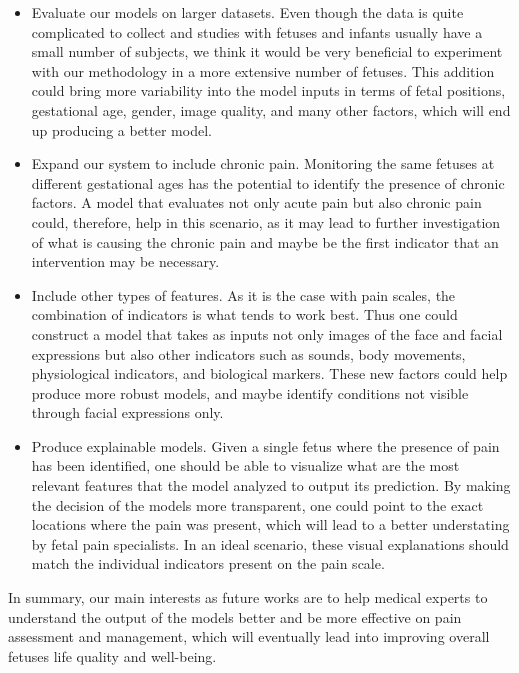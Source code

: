 \begin{itemize}
    \item Evaluate our models on larger datasets. Even though the data is quite complicated to collect and studies with fetuses and infants usually have a small number of subjects, we think it would be very beneficial to experiment with our methodology in a more extensive number of fetuses. This addition could bring more variability into the model inputs in terms of fetal positions, gestational age, gender, image quality, and many other factors, which will end up producing a better model.
    
    \item Expand our system to include chronic pain. Monitoring the same fetuses at different gestational ages has the potential to identify the presence of chronic factors. A model that evaluates not only acute pain but also chronic pain could, therefore, help in this scenario, as it may lead to further investigation of what is causing the chronic pain and maybe be the first indicator that an intervention may be necessary.

    \item Include other types of features. As it is the case with pain scales, the combination of indicators is what tends to work best. Thus one could construct a model that takes as inputs not only images of the face and facial expressions but also other indicators such as sounds, body movements, physiological indicators, and biological markers. These new factors could help produce more robust models, and maybe identify conditions not visible through facial expressions only.
    
    \item Produce explainable models. Given a single fetus where the presence of pain has been identified, one should be able to visualize what are the most relevant features that the model analyzed to output its prediction. By making the decision of the models more transparent, one could point to the exact locations where the pain was present, which will lead to a better understating by fetal pain specialists. In an ideal scenario, these visual explanations should match the individual indicators present on the pain scale.

\end{itemize}

In summary, our main interests as future works are to help medical experts to understand the output of the models better and be more effective on pain assessment and management, which will eventually lead into improving overall fetuses life quality and well-being.